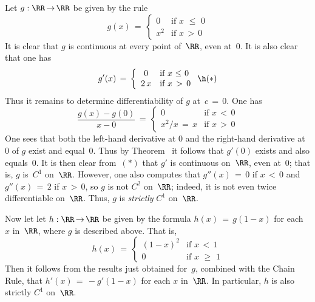 {        Let $g:{\RR} \,{\rightarrow}\, {\RR}$ be given by the rule
        \begin{displaymath}
        g(x) \,=\, \left\{
        \begin{array}{ll}
        0 & \mbox{if $x\,\,{\leq}\,\,0$} \\
        x^{2} & \mbox{if $x\,>\,0$}
        \end{array}
                            \right.
        \end{displaymath}
    It is clear that $g$ is continuous at every point of~${\RR}$, even at~$0$. It is also clear that one has
        \begin{displaymath}
        g'(x) \,=\, \left\{
        \begin{array}{cl}
        0 & \mbox{if $x\,\,{\leq}\,\,0$} \\
        2\,x & \mbox{if $x\,>\,0$}
        \end{array}
                            \right. \h ({\ast})
        \end{displaymath}
    Thus it remains to determine differentiability of $g$ at~$c \,=\, 0$. One has
        \begin{displaymath}
        \frac{g(x) - g(0)}{x-0} \,=\, \left\{
        \begin{array}{cl}
        0 & \mbox{if $x\,<\,0$} \\
        x^{2}/x \,=\, x & \mbox{if $x\,>\,0$}
        \end{array}
                            \right.
        \end{displaymath}
    One sees that both the left-hand derivative at $0$ and the right-hand derivative at $0$ of $g$ exist and equal~$0$.
    Thus by Theorem~ it follows that $g'(0)$ exists and also equals~$0$.
    It is then clear from~$({\ast})$ that $g'$ is continuous on~${\RR}$, even at~$0$; that is, $g$ is~$C^{1}$ on~${\RR}$.
    However, one also computes that $g''(x) \,=\, 0$ if $x\,<\,0$ and $g''(x) \,=\, 2$ if $x\,>\,0$, so $g$ is not $C^{2}$ on~${\RR}$;
    indeed, it is not even twice differentiable on~${\RR}$. Thus, $g$ is {\em strictly} $C^{1}$ on~${\RR}$.

\VV


        Now let let $h:{\RR} \,{\rightarrow}\, {\RR}$ be given by the formula $h(x) \,=\, g(1-x)$ for each $x$ in~${\RR}$, where $g$ is described above.
    That is,
        \begin{displaymath}
        h(x) \,=\, \left\{
        \begin{array}{ll}
        (1-x)^{2} & \mbox{if $x\,<\,1$} \\
          0         & \mbox{if $x\,\,{\geq}\,\,1$}
        \end{array}
                            \right.
        \end{displaymath}
    Then it follows from the results just obtained for~$g$, combined with the Chain Rule,
    that $h'(x) \,=\, -g'(1-x)$ for each $x$ in~${\RR}$. In particular, $h$ is also strictly $C^{1}$ on~${\RR}$.

}
